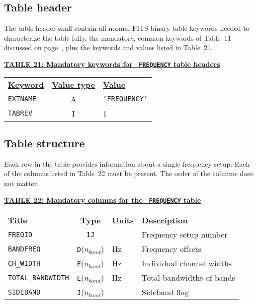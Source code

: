 \documentclass[twoside]{article}
\newcommand{\Hi}[1]{\textcolor{hicol}{#1}}
\newcommand{\nband}{$n_{band}$}
\begin{document}
\subsection{Table header}

\Hi{The table header shall contain all normal FITS binary table
keywords needed to characterize the table fully, the mandatory, common
keywords of Table~11 discussed on page~\pageref{ta:keywords}, plus the
keywords and values listed in Table~\Hi{21}.}

\begin{center}
\underline{\bf{TABLE \Hi{21}: Mandatory keywords for {\tt
    FREQUENCY} table headers}}\\
\begin{tabular}{lcl}
\noalign{\vspace{2pt}}
\underline{{\bf Keyword}} & \underline{\bf{Value type}} &
    \underline{\bf{Value\vphantom{y}}} \\
\noalign{\vspace{2pt}}
{\tt EXTNAME}   & A & {\tt 'FREQUENCY'}  \\
{\tt TABREV}    & I & 1 \\
\end{tabular}
\end{center}

\subsection{Table structure}

Each row in the table provides information about a single frequency
setup.  Each of the columns listed in Table~\Hi{22} must be present.
The order of the columns does not matter.

\begin{center}
\underline{\bf{TABLE \Hi{22}: Mandatory columns for the {\tt
      FREQUENCY} table}}\\
\begin{tabular}{lcll}
\noalign{\vspace{2pt}}
\underline{{\bf Title\vphantom{y}}} & \underline{\bf{Type}} &
   \underline{{\bf Units\vphantom{y}}} & \underline{\bf{Description}} \\
\noalign{\vspace{2pt}}
{\tt FREQID}    & {\tt 1J} &           & Frequency setup number \\
{\tt BANDFREQ}  & {\tt D}(\nband) & Hz & Frequency offsets \\
{\tt CH\_WIDTH} & {\tt \Hi{E}}(\nband) & Hz & Individual channel widths \\
{\tt TOTAL\_BANDWIDTH} & {\tt \Hi{E}}(\nband) & Hz & Total bandwidths
                                       of bands \\
{\tt SIDEBAND} & {\tt J}(\nband) &     & Sideband flag \\
\end{tabular}
\end{center}
\end{document}
